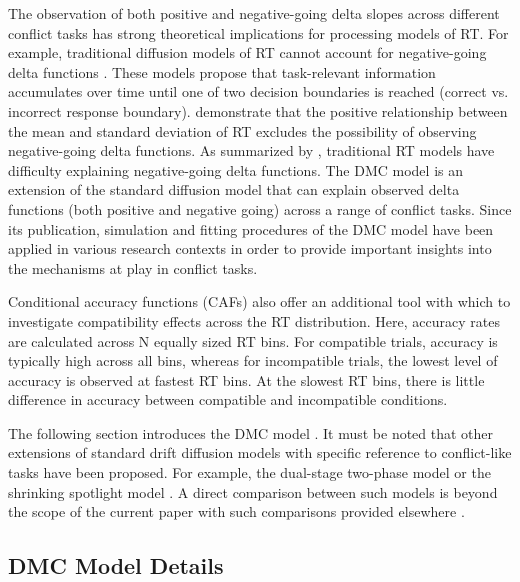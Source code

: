 The observation of both positive and negative-going delta slopes across
different conflict tasks has strong theoretical implications for processing
models of RT. For example, traditional diffusion models of RT cannot account
for negative-going delta functions \parencite{pratte2010exploring}. These
models propose that task-relevant information accumulates over time until one
of two decision boundaries is reached (correct vs. incorrect response
boundary). \textcite{wagenmakers2007linear} demonstrate that the positive
relationship between the mean and standard deviation of RT excludes the
possibility of observing negative-going delta functions. As summarized by
\textcite{ulrich2015automatic}, traditional RT models have difficulty
explaining negative-going delta functions. The DMC model is an extension of the
standard diffusion model that can explain observed delta functions (both
positive and negative going) across a range of conflict tasks. Since its
publication, simulation and fitting procedures of the DMC model have been
applied in various research contexts in order to provide important insights into
the mechanisms at play in conflict tasks\parencite[e.g.,][]{servant2016,
mittelstadt2020beyond}.

Conditional accuracy functions (CAFs) also offer an additional tool with which
to investigate compatibility effects across the RT distribution. Here, accuracy
rates are calculated across N equally sized RT bins. For compatible trials,
accuracy is typically high across all bins, whereas for incompatible trials,
the lowest level of accuracy is observed at fastest RT bins. At the slowest RT
bins, there is little difference in accuracy between compatible and
incompatible conditions.

The following section introduces the DMC model \textcite{ulrich2015automatic}.
It must be noted that other extensions of standard drift diffusion models with
specific reference to conflict-like tasks have been proposed. For example, the
dual-stage two-phase model \parencite[DSTP, ][]{hubner2010dual} or the shrinking
spotlight model \parencite[SSP, ][]{white2011diffusion}. A direct comparison
between such models is beyond the scope of the current paper with such
comparisons provided elsewhere \parencite[see][albeit with specific reference
to the flanker task only]{white2018testing, evans2020comparison}.

\subsection{DMC Model Details} 
\label{model_details} 

